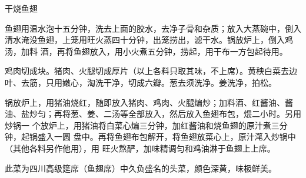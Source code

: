 %
%
%
%
%
%
%
\begin{recipe}{干烧鱼翅}

\ingredients


\preparation

\step 鱼翅用温水泡十五分钟，洗去上面的胶水，去净子骨和杂质；放入大蒸碗中，倒入
清水淹没鱼翅，上笼用旺火蒸四十分钟，出笼捞出，滤干水。锅放炉上，倒入鸡汤，加料
酒，再将鱼翅放入，用小火煮五分钟，捞起，用干布一方包起待用。

\step 鸡肉切成块。猪肉、火腿切成厚片（以上各料只取其味，不上席）。黄秧白菜去边
叶、去筋，只用嫩心，淘洗干净，切成六瓣。葱去须洗净。姜洗净，拍松。

\step 锅放炉上，用猪油烧红，随即放入猪肉、鸡肉、火腿煸炒；加料酒、红酱油、酱
油、盐炒匀；再将葱、姜、二汤等全部放入，然后放入鱼翅布包，煨二小时。另用炒锅一
个放炉上，用猪油将白菜心煸三分钟，加红酱油和烧鱼翅的原汁煮三分钟，起锅盛入一圆
盘中。再将鱼翅布包解开，将鱼翅放菜心上，原汁滗入炒锅中（其他各料另作他用），用
旺火熬酽，加味精调匀和鸡油淋于鱼翅上上席。

\features

此菜为四川高级筵席（鱼翅席）中久负盛名的头菜，颜色深黄，味极鲜美。

\end{recipe}

